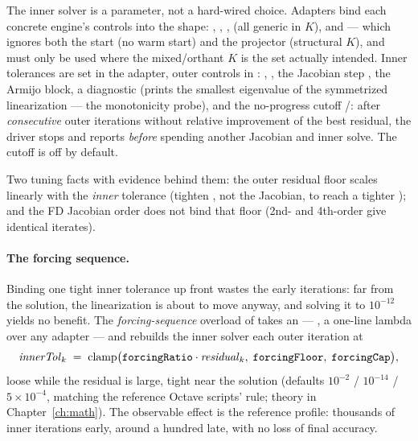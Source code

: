 The inner solver is a parameter, not a hard-wired choice. Adapters bind each
concrete engine's controls into the  shape:
, ,
,  (all generic in
$K$), and  --- which ignores both
the start (no warm start) and the projector (structural $K$), and must only
be used where the mixed/orthant $K$ is the set actually intended. Inner
tolerances are set in the adapter, outer controls in
: , , the
Jacobian step , the Armijo block, a diagnostic
 (prints the smallest eigenvalue of the
symmetrized linearization --- the monotonicity probe), and the no-progress
cutoff /: after
 \emph{consecutive} outer iterations without relative
improvement of the best residual, the driver stops and reports
 \emph{before} spending another Jacobian and inner
solve. The cutoff is off by default.

Two tuning facts with evidence behind them: the outer residual floor scales
linearly with the \emph{inner} tolerance (tighten , not
the Jacobian, to reach a tighter ); and the FD Jacobian order
does not bind that floor (2nd- and 4th-order give identical iterates).

\paragraph{The forcing sequence.} Binding one tight inner tolerance up
front wastes the early iterations: far from the solution, the linearization
is about to move anyway, and solving it to $10^{-12}$ yields no benefit. The
\emph{forcing-sequence} overload of  takes an
 --- , a one-line lambda over any  adapter ---
and rebuilds the inner solver each outer iteration at
\[
  \mathit{innerTol}_k \;=\;
  \mathrm{clamp}\bigl(\texttt{forcingRatio}\cdot \mathit{residual}_k,\;
  \texttt{forcingFloor},\; \texttt{forcingCap}\bigr),
\]
loose while the residual is large, tight near the solution (defaults
$10^{-2}$ / $10^{-14}$ / $5\times 10^{-4}$, matching the reference Octave
scripts'  rule; theory in
Chapter~\ref{ch:math}). The observable effect is the reference profile:
thousands of inner iterations early, around a hundred late, with no loss of
final accuracy.

